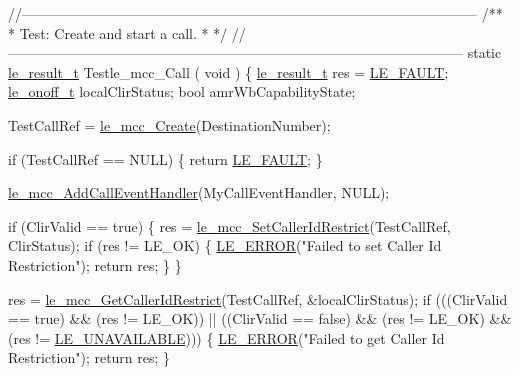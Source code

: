 \begin{DoxyCodeInclude}
{{{{{\textcolor{comment}{//--------------------------------------------------------------------------------------------------}\textcolor{comment}{}
\textcolor{comment}{/**}
\textcolor{comment}{ * Test: Create and start a call.}
\textcolor{comment}{ *}
\textcolor{comment}{ */}
\textcolor{comment}{//--------------------------------------------------------------------------------------------------}
\textcolor{keyword}{static} \hyperlink{le__basics_8h_a1cca095ed6ebab24b57a636382a6c86c}{le\_result\_t} Testle\_mcc\_Call
(
    \textcolor{keywordtype}{void}
)
\{
    \hyperlink{le__basics_8h_a1cca095ed6ebab24b57a636382a6c86c}{le\_result\_t}          res = \hyperlink{le__basics_8h_a1cca095ed6ebab24b57a636382a6c86cac409634423b6b1ef09643529f6224798}{LE\_FAULT};
    \hyperlink{le__basics_8h_ae2138c90c41d30e2d510be01d8b374da}{le\_onoff\_t}           localClirStatus;
    \textcolor{keywordtype}{bool}                 amrWbCapabilityState;

    TestCallRef = \hyperlink{le__mcc__interface_8h_a42130fc6b1d69413a387e3292117b3d3}{le\_mcc\_Create}(DestinationNumber);

    \textcolor{keywordflow}{if} (TestCallRef == NULL)
    \{
        \textcolor{keywordflow}{return} \hyperlink{le__basics_8h_a1cca095ed6ebab24b57a636382a6c86cac409634423b6b1ef09643529f6224798}{LE\_FAULT};
    \}

    \hyperlink{le__mcc__interface_8h_ab826cf4b9e3911e659a90d483081e7fe}{le\_mcc\_AddCallEventHandler}(MyCallEventHandler, NULL);

    \textcolor{keywordflow}{if} (ClirValid == \textcolor{keyword}{true})
    \{
        res = \hyperlink{le__mcc__interface_8h_a6b7fda9b1d0f0208a99b4bdcafe97538}{le\_mcc\_SetCallerIdRestrict}(TestCallRef, ClirStatus);
        \textcolor{keywordflow}{if} (res != LE\_OK)
        \{
            \hyperlink{le__log_8h_a353590f91b3143a7ba3a416ae5a50c3d}{LE\_ERROR}(\textcolor{stringliteral}{"Failed to set Caller Id Restriction"});
            \textcolor{keywordflow}{return} res;
        \}
    \}

    res = \hyperlink{le__mcc__interface_8h_a54093f7d51cae9a186a97aa799ac3ddc}{le\_mcc\_GetCallerIdRestrict}(TestCallRef, &localClirStatus);
    \textcolor{keywordflow}{if} (((ClirValid == \textcolor{keyword}{true}) && (res != LE\_OK)) ||
        ((ClirValid == \textcolor{keyword}{false}) && (res != LE\_OK) && (res != \hyperlink{le__basics_8h_a1cca095ed6ebab24b57a636382a6c86cabf039026140e8a341a0e9bbd78271f23}{LE\_UNAVAILABLE})))
    \{
        \hyperlink{le__log_8h_a353590f91b3143a7ba3a416ae5a50c3d}{LE\_ERROR}(\textcolor{stringliteral}{"Failed to get Caller Id Restriction"});
        \textcolor{keywordflow}{return} res;
    \}

}}}}}
\end{DoxyCodeInclude}
